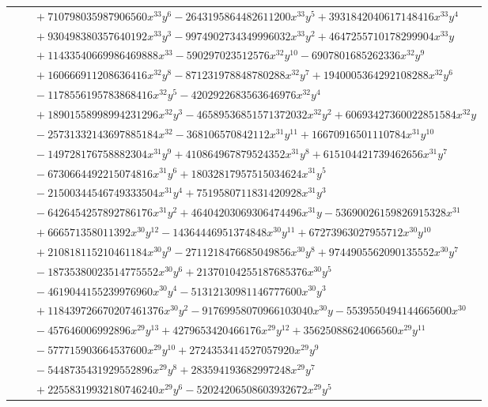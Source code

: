 \documentclass[11pt]{article}
\begin{document}
\begin{longtable}{@{}ll@{}}
 & $\quad +710798035987906560x^{33}y^{6}-2643195864482611200x^{33}y^{5}+3931842040617148416x^{33}y^{4}$\\
 & $\quad +930498380357640192x^{33}y^{3}-9974902734349996032x^{33}y^{2}+4647255710178299904x^{33}y$\\
 & $\quad +11433540669986469888x^{33}-590297023512576x^{32}y^{10}-6907801685262336x^{32}y^{9}$\\
 & $\quad +160666911208636416x^{32}y^{8}-871231978848780288x^{32}y^{7}+1940005364292108288x^{32}y^{6}$\\
 & $\quad -1178556195783868416x^{32}y^{5}-4202922683563646976x^{32}y^{4}$\\
 & $\quad +18901558998994231296x^{32}y^{3}-46589536851571372032x^{32}y^{2}+60693427360022851584x^{32}y$\\
 & $\quad -25731332143697885184x^{32}-368106570842112x^{31}y^{11}+16670916501110784x^{31}y^{10}$\\
 & $\quad -149728176758882304x^{31}y^{9}+410864967879524352x^{31}y^{8}+615104421739462656x^{31}y^{7}$\\
 & $\quad -6730664492215074816x^{31}y^{6}+18032817957515034624x^{31}y^{5}$\\
 & $\quad -21500344546749333504x^{31}y^{4}+7519580711831420928x^{31}y^{3}$\\
 & $\quad -6426454257892786176x^{31}y^{2}+46404203069306474496x^{31}y-53690026159826915328x^{31}$\\
 & $\quad +666571358011392x^{30}y^{12}-14364446951374848x^{30}y^{11}+67273963027955712x^{30}y^{10}$\\
 & $\quad +210818115210461184x^{30}y^{9}-2711218476685049856x^{30}y^{8}+9744905562090135552x^{30}y^{7}$\\
 & $\quad -18735380023514775552x^{30}y^{6}+21370104255187685376x^{30}y^{5}$\\
 & $\quad -4619044155239976960x^{30}y^{4}-51312130981146777600x^{30}y^{3}$\\
 & $\quad +118439726670207461376x^{30}y^{2}-91769958070966103040x^{30}y-5539550494144665600x^{30}$\\
 & $\quad -457646006992896x^{29}y^{13}+4279653420466176x^{29}y^{12}+35625088624066560x^{29}y^{11}$\\
 & $\quad -577715903664537600x^{29}y^{10}+2724353414527057920x^{29}y^{9}$\\
 & $\quad -5448735431929552896x^{29}y^{8}+283594193682997248x^{29}y^{7}$\\
 & $\quad +22558319932180746240x^{29}y^{6}-52024206508603932672x^{29}y^{5}$\\

\end{longtable}
\end{document}
